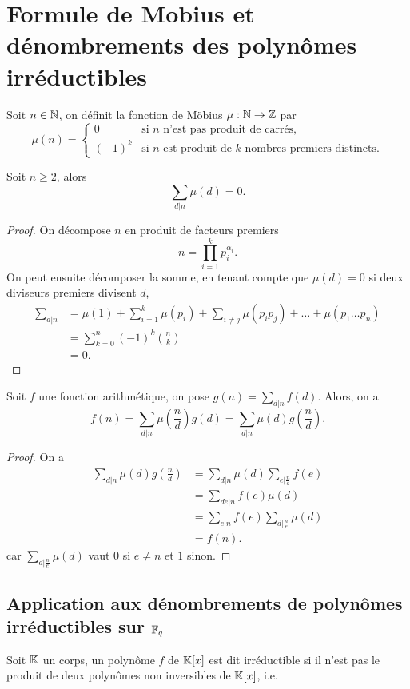 \documentclass[../main.tex]{subfiles}
\begin{document}
\section{Formule de Mobius et dénombrements des polynômes irréductibles}
\begin{definition} Soit \(n\in\mathbb{N}\), on définit la fonction de Möbius \(\mu:\mathbb{N}\to\mathbb{Z}\) par
    \begin{equation}
        \mu(n) = \begin{cases}
            0 & \text{si } n \text{ n'est pas produit de carrés,}\\
            (-1)^k & \text{si } n \text{ est produit de } k \text{ nombres premiers distincts.}
        \end{cases}
    \end{equation}
\end{definition}
\begin{proposition} Soit \(n\ge 2\), alors
    \begin{equation}
        \sum_{d|n} \mu(d) = 0.
    \end{equation}
\end{proposition}
\begin{proof} On décompose \(n\) en produit de facteurs premiers 
    \begin{equation}
        n = \prod_{i=1}^k p_i^{\alpha_i}.
    \end{equation}
    On peut ensuite décomposer la somme, en tenant compte que \(\mu(d) = 0\) si deux diviseurs premiers divisent \(d\),
    \begin{align}
        \sum_{d|n} &= \mu(1) + \sum_{i=1}^k \mu(p_i) + \sum_{i\neq j} \mu(p_ip_j) + \ldots + \mu(p_1\ldots p_n)\\
        &= \sum_{k=0}^n (-1)^k \binom{n}{k}\\ 
        &= 0.
    \end{align}
\end{proof}
\begin{theorem} Soit \(f\) une fonction arithmétique, on pose 
    \(g(n) = \sum_{d|n} f(d)\). Alors, on a
    \begin{equation}
        f(n) = \sum_{d|n}\mu\left(\frac{n}{d}\right) g(d) = \sum_{d|n}\mu(d)g\left(\frac{n}{d}\right).
    \end{equation}
\end{theorem}
\begin{proof} On a
    \begin{align}
        \sum_{d|n}\mu(d)g\left(\frac{n}{d}\right) & = \sum_{d|n}\mu(d)\sum_{e|\frac{n}{d}}f(e)\\
        & = \sum_{de|n}f(e)\mu(d)\\
        & = \sum_{e|n}f(e)\sum_{d|\frac{n}{e}}\mu(d)\\
        & = f(n).
    \end{align}
    car \(\sum_{d|\frac{n}{e}}\mu(d)\) vaut \(0\) si \(e\neq n\) et \(1\) sinon.
\end{proof}
\subsection*{Application aux dénombrements de polynômes irréductibles sur \(\mathbb{F}_q\)}
\begin{definition} Soit \(\mathbb{K}\) un corps, un polynôme \(f\) de \(\mathbb{K}[x]\) est dit irréductible si
    il n'est pas le produit de deux polynômes non inversibles de \(\mathbb{K}[x]\), i.e.

\end{definition}
\end{document}
